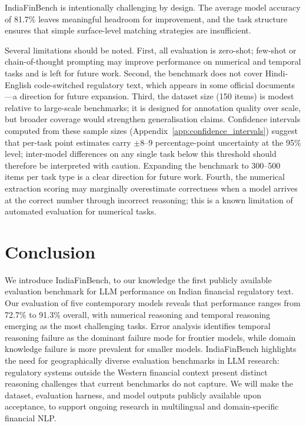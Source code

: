 \documentclass[11pt]{article}
\begin{document}
IndiaFinBench is intentionally challenging by design. The average model accuracy
of 81.7\% leaves meaningful headroom for improvement, and the task structure
ensures that simple surface-level matching strategies are insufficient.

Several limitations should be noted. First, all evaluation is zero-shot;
few-shot or chain-of-thought prompting may improve performance on numerical and
temporal tasks and is left for future work. Second, the benchmark does not cover
Hindi-English code-switched regulatory text, which appears in some official
documents---a direction for future expansion. Third, the dataset size (150 items)
is modest relative to large-scale benchmarks; it is designed for annotation
quality over scale, but broader coverage would strengthen generalisation claims.
Confidence intervals computed from these sample sizes
(Appendix~\ref{app:confidence_intervals}) suggest that per-task point estimates
carry ${\pm}8$--9 percentage-point uncertainty at the 95\% level; inter-model
differences on any single task below this threshold should therefore be
interpreted with caution. Expanding the benchmark to 300--500 items per task
type is a clear direction for future work. Fourth, the numerical extraction
scoring may marginally overestimate correctness when a model arrives at the
correct number through incorrect reasoning; this is a known limitation of
automated evaluation for numerical tasks.

\section{Conclusion}

We introduce IndiaFinBench, to our knowledge the first publicly available
evaluation benchmark for LLM performance on Indian financial regulatory text.
Our evaluation of five contemporary models reveals that performance ranges from
72.7\% to 91.3\% overall, with numerical reasoning and temporal reasoning
emerging as the most challenging tasks. Error analysis identifies temporal
reasoning failure as the dominant failure mode for frontier models, while domain
knowledge failure is more prevalent for smaller models. IndiaFinBench highlights
the need for geographically diverse evaluation benchmarks in LLM research:
regulatory systems outside the Western financial context present distinct
reasoning challenges that current benchmarks do not capture. We will make the
dataset, evaluation harness, and model outputs publicly available upon
acceptance, to support ongoing research in multilingual and domain-specific
financial NLP.
\end{document}

